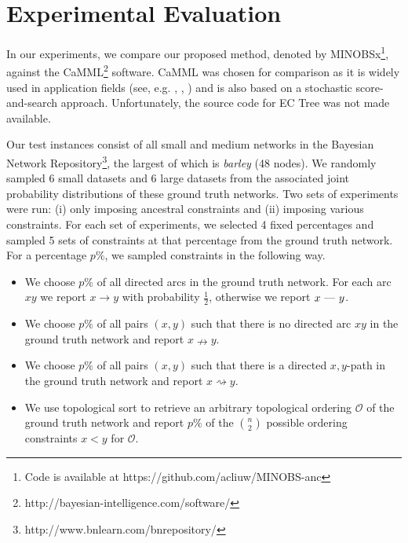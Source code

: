 \documentclass[twoside,11pt]{article}
\begin{document}
\section{Experimental Evaluation}
\label{SECTION:Experimental}

In our experiments, we compare our proposed method, denoted by MINOBSx\footnote{Code is available at https://github.com/acliuw/MINOBS-anc},
against the CaMML\footnote{http://bayesian-intelligence.com/software/} software. CaMML was chosen for comparison as it is widely
used in application fields (see, e.g. \cite{Flores2011}, \cite{Kennett2001}, \cite{Sesen2013}) and is also based on a stochastic score-and-search approach. 
Unfortunately, the source code for EC Tree was not made available.

\smallskip
Our test instances consist of all small and medium networks in the Bayesian Network Repository\footnote{http://www.bnlearn.com/bnrepository/}, the largest of 
which is \emph{barley} (48 nodes). We randomly sampled 6 small datasets and 6 large datasets from the associated joint
probability distributions of these ground truth networks. Two sets of experiments were run:
(i) only imposing ancestral constraints and (ii) imposing various constraints. For each set of experiments, we selected 4 fixed percentages and sampled 5 sets of constraints
at that percentage from the ground truth network. For a percentage $p\%$, we sampled constraints in the following way.

\begin{itemize}
\itemsep0em
\item We choose $p\%$ of all directed arcs in the ground truth network. For each arc $xy$ we report $x \rightarrow y$ with probability $\frac{1}{2}$, otherwise we report 
$x \text{ \textemdash \  } y$.

\item We choose $p\%$ of all pairs $(x, y)$ such that there is no directed arc $xy$ in the ground truth network and report $x \nrightarrow y$. 

\item We choose $p\%$ of all pairs $(x, y)$ such that there is a directed $x, y$-path in the ground truth network and report $x \rightsquigarrow y$.

\item We use topological sort to retrieve an arbitrary topological ordering $\mathcal{O}$ of the ground truth network and report $p\%$ of the $n \choose 2$ possible ordering constraints $x < y$ for
$\mathcal{O}$. 
\end{itemize}
\end{document}
